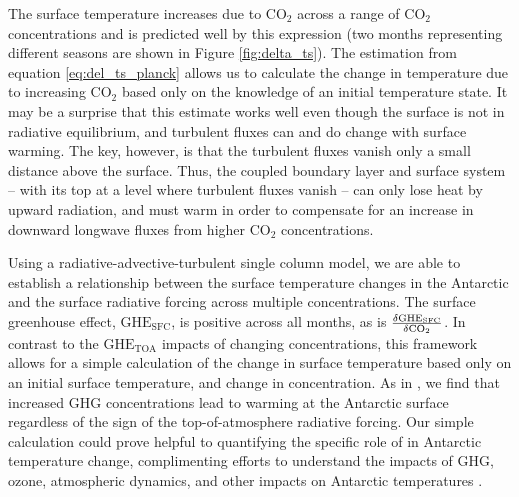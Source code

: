 \documentclass[draft]{agujournal2019}
\begin{document}
The surface temperature increases due to CO$_2$ across a range of CO$_2$ concentrations and is predicted well by this expression (two months representing different seasons are shown in Figure \ref{fig:delta_ts}). The estimation from equation \ref{eq:del_ts_planck} allows us to calculate the change in temperature due to increasing CO$_2$ based only on the knowledge of an initial temperature state. It may be a surprise that this estimate works well even though the surface is not in radiative equilibrium, and turbulent fluxes can and do change with surface warming. The key, however, is that the turbulent fluxes vanish only a small distance above the surface. Thus, the coupled boundary layer and surface system -- with its top at a level where turbulent fluxes vanish -- can only lose heat by upward radiation, and must warm in order to compensate for an increase in downward longwave fluxes from higher CO$_2$ concentrations.  

Using a radiative-advective-turbulent single column model, we are able to establish a relationship between the surface temperature changes in the Antarctic and the surface radiative forcing across multiple  concentrations. The  surface greenhouse effect, $\text{GHE}_\text{{SFC}}$, is positive across all months, as is $\frac{\delta{\text{GHE}_\text{{SFC}}}}{\delta\ce{CO_2}}$. In contrast to the $\text{GHE}_\text{{TOA}}$ impacts of changing  concentrations, this framework allows for a simple calculation of the change in surface temperature based only on an initial surface temperature, and change in  concentration. As in , we find that increased GHG concentrations lead to warming at the Antarctic surface regardless of the sign of the top-of-atmosphere radiative forcing. Our simple calculation could prove helpful to quantifying the specific role of  in Antarctic temperature change, complimenting efforts to understand the impacts of GHG, ozone, atmospheric dynamics, and other impacts on Antarctic temperatures \cite{shindell_southern_2004, thompson_signatures_2011}.
\end{document}
